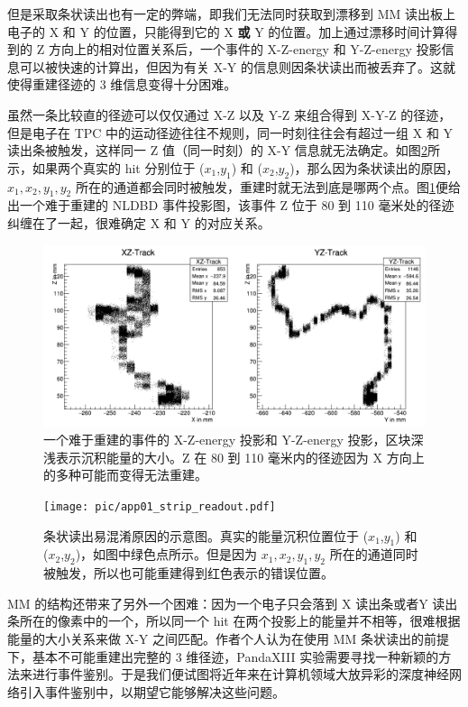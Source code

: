 但是采取条状读出也有一定的弊端，即我们无法同时获取到漂移到 MM 读出板上电子的 X 和 Y 的位置，只能得到它的 X \textbf{或} Y 的位置。加上通过漂移时间计算得到的 Z 方向上的相对位置关系后，一个事件的 X-Z-energy 和 Y-Z-energy 投影信息可以被快速的计算出，但因为有关 X-Y 的信息则因条状读出而被丢弃了。这就使得重建径迹的 3 维信息变得十分困难。

虽然一条比较直的径迹可以仅仅通过 X-Z 以及 Y-Z 来组合得到 X-Y-Z 的径迹，但是电子在 TPC 中的运动径迹往往不规则，同一时刻往往会有超过一组 X 和 Y 读出条被触发，这样同一 Z 值（同一时刻）的 X-Y 信息就无法确定。如图\ref{fig:difficulty_track_2}所示，如果两个真实的 hit 分别位于 ($x_1$,$y_1$) 和 ($x_2$,$y_2$)，那么因为条状读出的原因，$x_1,x_2,y_1,y_2$ 所在的通道都会同时被触发，重建时就无法到底是哪两个点。图\ref{fig:difficulty_track}便给出一个难于重建的 NLDBD 事件投影图，该事件 Z 位于 80 到 110 毫米处的径迹纠缠在了一起，很难确定 X 和 Y 的对应关系。

\begin{figure}
    \centering
    \includegraphics[width=0.7\columnwidth]{pic/difficulty_track.png}
    \caption{一个难于重建的事件的 X-Z-energy 投影和 Y-Z-energy 投影，区块深浅表示沉积能量的大小。Z 在 80 到 110 毫米内的径迹因为 X 方向上的多种可能而变得无法重建。}
    \label{fig:difficulty_track}
\end{figure}

\begin{figure}
    \centering
    \texttt{[image: pic/app01\_strip\_readout.pdf]}
    \caption{条状读出易混淆原因的示意图。真实的能量沉积位置位于 ($x_1$,$y_1$) 和 ($x_2$,$y_2$)，如图中绿色点所示。但是因为 $x_1,x_2,y_1,y_2$ 所在的通道同时被触发，所以也可能重建得到红色表示的错误位置。}
    \label{fig:difficulty_track_2}
\end{figure}

MM 的结构还带来了另外一个困难：因为一个电子只会落到 X 读出条或者Y 读出条所在的像素中的一个，所以同一个 hit 在两个投影上的能量并不相等，很难根据能量的大小关系来做 X-Y 之间匹配。作者个人认为在使用 MM 条状读出的前提下，基本不可能重建出完整的 3 维径迹，PandaXIII 实验需要寻找一种新颖的方法来进行事件鉴别。于是我们便试图将近年来在计算机领域大放异彩的深度神经网络引入事件鉴别中，以期望它能够解决这些问题。

